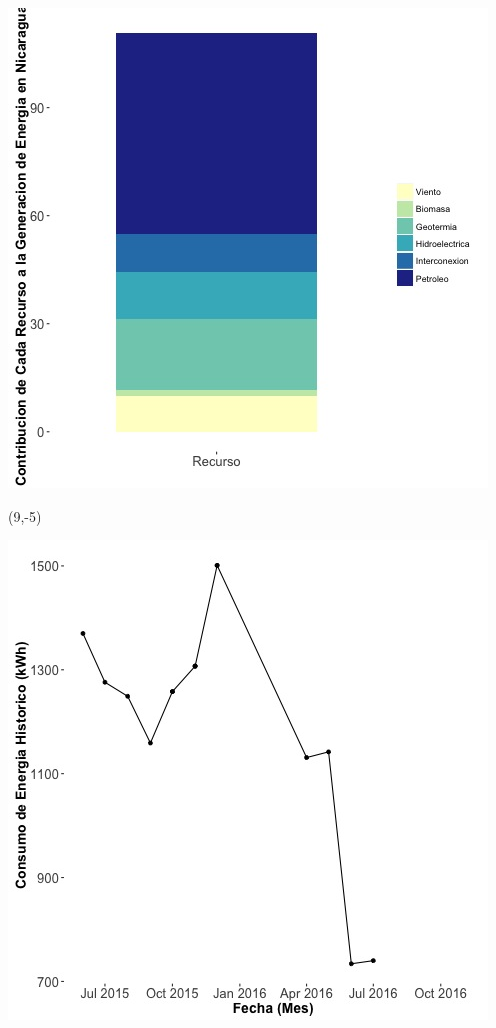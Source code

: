 \documentclass{article}\usepackage[]{graphicx}\usepackage[]{color}
\newenvironment{knitrout}{}{} %
\begin{document}
\begin{knitrout}
\color{fgcolor}
\includegraphics[scale=0.65]{figure/gridplot2.jpg} 
\end{knitrout}

 \begin{textblock}{1}(9,-5)
\begin{minipage}{20em}
\begingroup

\endgroup
\end{minipage}
\end{textblock}

\begin{knitrout}
\color{fgcolor}
\includegraphics[scale=0.65]{figure/A26_historico_energia} 
\end{knitrout}
\end{document}
